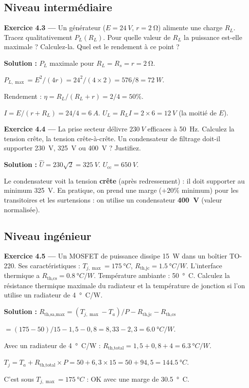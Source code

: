 \documentclass[12pt,a4paper,twoside]{book}
\begin{document}
\subsection*{Niveau intermédiaire}

\textbf{Exercice 4.3 —} Un générateur ($E = \SI{24}{V}$, $r = \SI{2}{\ohm}$) alimente une charge $R_L$. Tracez qualitativement $P_L(R_L)$. Pour quelle valeur de $R_L$ la puissance est-elle maximale ? Calculez-la. Quel est le rendement à ce point ?

\begin{pratique}
\textbf{Solution :} $P_L$ maximale pour $R_L = R_s = r = \SI{2}{\ohm}$.

$P_{L,\max} = E^2/(4r) = 24^2/(4\times2) = 576/8 = \SI{72}{W}$.

Rendement : $\eta = R_L/(R_L + r) = 2/4 = 50\%$.

$I = E/(r+R_L) = 24/4 = \SI{6}{A}$. $U_L = R_L I = 2\times6 = \SI{12}{V}$ (la moitié de $E$).
\end{pratique}

\textbf{Exercice 4.4 —} La prise secteur délivre $\SI{230}{V}$ efficaces à \SI{50}{Hz}. Calculez la tension crête, la tension crête-à-crête. Un condensateur de filtrage doit-il supporter \SI{230}{V}, \SI{325}{V} ou \SI{400}{V} ? Justifiez.

\begin{pratique}
\textbf{Solution :} $\hat{U} = 230\sqrt{2} = \SI{325}{V}$. $U_{\text{cc}} = \SI{650}{V}$.

Le condensateur voit la tension \textbf{crête} (après redressement) : il doit supporter au minimum \SI{325}{V}. En pratique, on prend une marge ($+20\%$ minimum) pour les transitoires et les surtensions : on utilise un condensateur \textbf{\SI{400}{V}} (valeur normalisée).
\end{pratique}

\subsection*{Niveau ingénieur}

\textbf{Exercice 4.5 —} Un MOSFET de puissance dissipe \SI{15}{W} dans un boîtier TO-220. Ses caractéristiques : $T_{j,\max} = \SI{175}{°C}$, $R_{\text{th,jc}} = \SI{1.5}{°C/W}$. L'interface thermique a $R_{\text{th,cs}} = \SI{0.8}{°C/W}$. Température ambiante : \SI{50}{°C}. Calculez la résistance thermique maximale du radiateur et la température de jonction si l'on utilise un radiateur de \SI{4}{°C/W}.

\begin{pratique}
\textbf{Solution :} $R_{\text{th,sa,max}} = (T_{j,\max} - T_a)/P - R_{\text{th,jc}} - R_{\text{th,cs}}$

$= (175-50)/15 - 1{,}5 - 0{,}8 = 8{,}33 - 2{,}3 = \SI{6.0}{°C/W}$.

Avec un radiateur de \SI{4}{°C/W} : $R_{\text{th,total}} = 1{,}5 + 0{,}8 + 4 = \SI{6.3}{°C/W}$.

$T_j = T_a + R_{\text{th,total}} \times P = 50 + 6{,}3 \times 15 = 50 + 94{,}5 = \SI{144.5}{°C}$.

C'est sous $T_{j,\max} = \SI{175}{°C}$ : OK avec une marge de \SI{30.5}{°C}.
\end{pratique}
\end{document}
